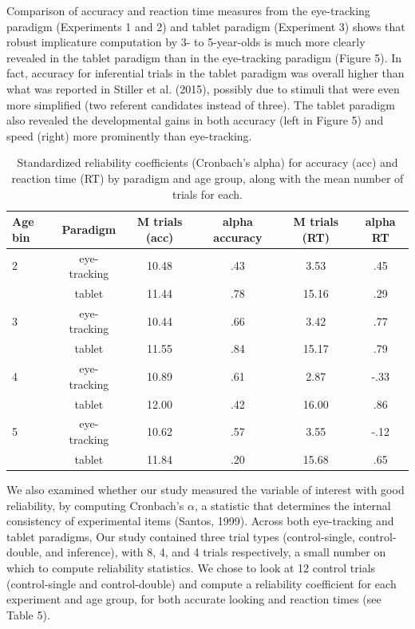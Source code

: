 \documentclass[a4paper,man,apacite,floatsintext]{apa6}
\begin{document}
Comparison of accuracy and reaction time measures from the eye-tracking
paradigm (Experiments 1 and 2) and tablet paradigm (Experiment 3) shows
that robust implicature computation by 3- to 5-year-olds is much more
clearly revealed in the tablet paradigm than in the eye-tracking
paradigm (Figure 5). In fact, accuracy for inferential trials in the
tablet paradigm was overall higher than what was reported in Stiller et
al. (2015), possibly due to stimuli that were even more simplified (two
referent candidates instead of three). The tablet paradigm also revealed
the developmental gains in both accuracy (left in Figure 5) and speed
(right) more prominently than eye-tracking.

\begin{table}[tb]
\centering
\begin{tabular}{lccccc}
 Age bin & Paradigm & M trials (acc) & alpha accuracy & M trials (RT) & alpha RT \\ 
  \hline
2 & eye-tracking & 10.48 & .43 & 3.53 & .45 \\ 
    & tablet & 11.44 & .78 & 15.16 & .29 \\ 
  3 & eye-tracking & 10.44 & .66 & 3.42 & .77 \\ 
    & tablet & 11.55 & .84 & 15.17 & .79 \\ 
  4 & eye-tracking & 10.89 & .61 & 2.87 & -.33 \\ 
    & tablet & 12.00 & .42 & 16.00 & .86 \\ 
  5 & eye-tracking & 10.62 & .57 & 3.55 & -.12 \\ 
    & tablet & 11.84 & .20 & 15.68 & .65 \\ 
   \hline
\end{tabular}
\caption{Standardized reliability coefficients (Cronbach's alpha) for accuracy (acc) and reaction time (RT) by paradigm and age group, along with the mean number of trials for each.} 
\label{tab:etip_rel}
\end{table}

We also examined whether our study measured the variable of interest
with good reliability, by computing Cronbach's \(\alpha\), a statistic
that determines the internal consistency of experimental items (Santos,
1999). Across both eye-tracking and tablet paradigms, Our study
contained three trial types (control-single, control-double, and
inference), with 8, 4, and 4 trials respectively, a small number on
which to compute reliability statistics. We chose to look at 12 control
trials (control-single and control-double) and compute a reliability
coefficient for each experiment and age group, for both accurate looking
and reaction times (see Table 5).
\end{document}
